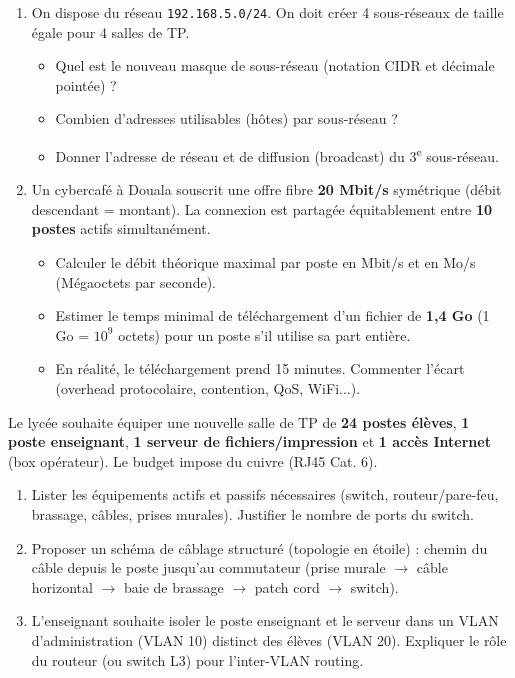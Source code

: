 \documentclass[11pt]{article}
\newcounter{popsec}
\newcounter{popsub}
\newcommand{\courssub}[1]{%
  \stepcounter{popsub}%
  \par\vspace{9pt}\noindent{\popxbold\fontsize{11.5}{13}\selectfont\color{popink}{\color{poporange}\thepopsec.\thepopsub}\hspace{6pt}#1}\par\nopagebreak\vspace{4pt}
}
\begin{document}
\begin{exercice}
\begin{enumerate}
    \item On dispose du réseau \texttt{192.168.5.0/24}. On doit créer 4 sous-réseaux de taille égale pour 4 salles de TP.
    \begin{itemize}
        \item[a)] Quel est le nouveau masque de sous-réseau (notation CIDR et décimale pointée) ?
        \item[b)] Combien d'adresses utilisables (hôtes) par sous-réseau ?
        \item[c)] Donner l'adresse de réseau et de diffusion (broadcast) du 3\textsuperscript{e} sous-réseau.
    \end{itemize}
    \item Un cybercafé à Douala souscrit une offre fibre \textbf{20 Mbit/s} symétrique (débit descendant = montant). La connexion est partagée équitablement entre \textbf{10 postes} actifs simultanément.
    \begin{itemize}
        \item[a)] Calculer le débit théorique maximal par poste en Mbit/s et en Mo/s (Mégaoctets par seconde).
        \item[b)] Estimer le temps minimal de téléchargement d'un fichier de \textbf{1,4 Go} (1 Go = $10^9$ octets) pour un poste s'il utilise sa part entière.
        \item[c)] En réalité, le téléchargement prend 15 minutes. Commenter l'écart (overhead protocolaire, contention, QoS, WiFi...).
    \end{itemize}
\end{enumerate}
\end{exercice}

\courssub{Je m'entraîne}

\begin{exercice}
Le lycée souhaite équiper une nouvelle salle de TP de \textbf{24 postes élèves}, \textbf{1 poste enseignant}, \textbf{1 serveur de fichiers/impression} et \textbf{1 accès Internet} (box opérateur). Le budget impose du cuivre (RJ45 Cat. 6).
\begin{enumerate}
    \item Lister les équipements actifs et passifs nécessaires (switch, routeur/pare-feu, brassage, câbles, prises murales). Justifier le nombre de ports du switch.
    \item Proposer un schéma de câblage structuré (topologie en étoile) : chemin du câble depuis le poste jusqu'au commutateur (prise murale $\to$ câble horizontal $\to$ baie de brassage $\to$ patch cord $\to$ switch).
    \item L'enseignant souhaite isoler le poste enseignant et le serveur dans un VLAN d'administration (VLAN 10) distinct des élèves (VLAN 20). Expliquer le rôle du routeur (ou switch L3) pour l'inter-VLAN routing.
\end{enumerate}
\end{exercice}
\end{document}
